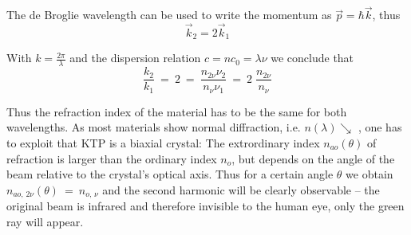 The de Broglie wavelength can be used to write the momentum as  $\vec p = \hbar \vec k$, thus
\begin{equation}
	\vec k_2 = 2 \vec k_1
\end{equation}

With $k = \frac{2 \pi}{\lambda}$ and the dispersion relation $c = n c_0 = \lambda \nu$ we conclude that
\begin{equation}
\frac{k_2}{k_1} ~=~ 2 ~=~ \frac{n_{2\nu} \nu_2}{n_\nu \nu_1} ~=~ 2\;\frac{n_{2\nu}}{n_\nu}
\end{equation}

Thus the refraction index of the material has to be the same for both wavelengths. As most materials show normal diffraction, i.e. $n(\lambda) \searrow$ , one has to exploit that KTP is a biaxial crystal: The extrordinary index $n_{ao}(\theta)$ of refraction is larger than the ordinary index $n_o$, but depends on the angle of the beam relative to the crystal's optical axis. Thus for a certain angle $\theta$ we obtain $n_{ao, \,2\nu}(\theta) ~=~ n_{o, \,\nu}$ and the second harmonic will be clearly observable -- the original beam is infrared and therefore invisible to the human eye, only the green ray will appear.

